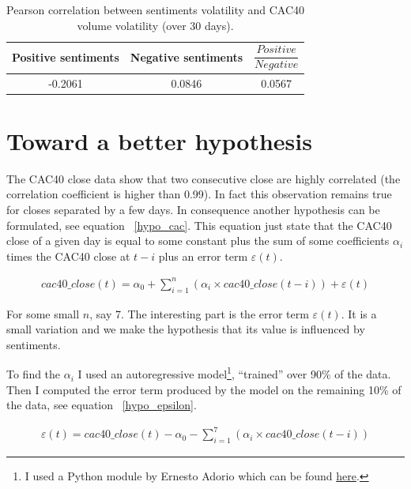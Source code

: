 \documentclass[12pt]{report}
\begin{document}
\begin{table}
	\begin{center}
		\begin{tabular}{|c | c | c|}
			\hline
			Positive sentiments & Negative sentiments & $\dfrac{Positive}{Negative}$\\
			\hline
			-0.2061 & 0.0846 & 0.0567\\
			\hline
		\end{tabular}
	\end{center}

	\caption{Pearson correlation between sentiments volatility and CAC40 volume volatility (over 30 days).\label{pearson_vol_vol}}
\end{table}

\section{Toward a better hypothesis}

The CAC40 close data show that two consecutive close are highly correlated (the correlation coefficient is higher than 0.99). In fact this observation remains true for closes separated by a few days. In consequence another hypothesis can be formulated, see equation ~\ref{hypo_cac}. This equation just state that the CAC40 close of a given day is equal to some constant plus the sum of some coefficients $\alpha_i$ times the CAC40 close at $t - i$ plus an error term $\varepsilon(t)$.

\begin{eqnarray}
	cac40\_close(t) = \alpha_0 + \sum_{i = 1}^{n}\left(\alpha_i\times{}cac40\_close(t - i)\right) + \varepsilon(t)\label{hypo_cac}
\end{eqnarray}

For some small $n$, say 7. The interesting part is the error term $\varepsilon(t)$. It is a small variation and we make the hypothesis that its value is influenced by sentiments.

To find the $\alpha_i$ I used an autoregressive model\footnote{I used a Python module by Ernesto Adorio which can be found \href{http://adorio-research.org/wordpress/?p=4551}{here}.}, ``trained'' over 90\% of the data. Then I computed the error term produced by the model on the remaining 10\% of the data, see equation ~\ref{hypo_epsilon}.

\begin{eqnarray}
	\varepsilon(t) = cac40\_close(t) - \alpha_0 - \sum_{i = 1}^{7} \left(\alpha_i\times{}cac40\_close(t - i)\right)\label{hypo_epsilon}
\end{eqnarray}
\end{document}
